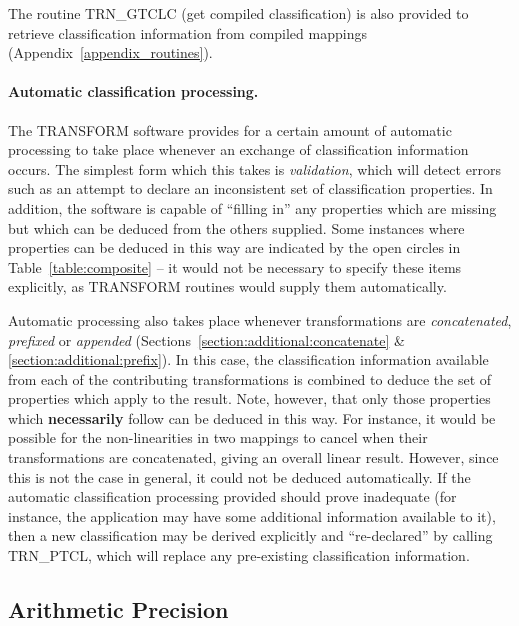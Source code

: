 \documentclass[twoside,nolof,11pt]{starlink}
\providecommand{\name}[1]{\small{#1}}
\begin{document}
The routine \name{TRN\_GTCLC} (get compiled classification) is also provided
to retrieve classification information from compiled mappings
(Appendix~\ref{appendix_routines}).

\paragraph{Automatic classification processing.}
The \name{TRANSFORM} software provides for a certain amount of automatic
processing to take place whenever an exchange of classification information
occurs.
The simplest form which this takes is \emph{validation}, which will detect
errors such as an attempt to declare an inconsistent set of classification
properties.
In addition, the software is capable of ``filling in'' any properties which
are missing but which can be deduced from the others supplied.
Some instances where properties can be deduced in this way are indicated by
the open circles in Table~\ref{table:composite} -- it would not be
necessary to specify these items explicitly, as \name{TRANSFORM} routines
would supply them automatically.

Automatic processing also takes place whenever transformations are
\emph{concatenated}, \emph{prefixed} or \emph{appended}
(Sections~\ref{section:additional:concatenate} \&
\ref{section:additional:prefix}).
In this case, the classification information available from each of the
contributing transformations is combined to deduce the set of
properties which apply to the result.
Note, however, that only those properties which \textbf{necessarily} follow can
be deduced in this way.
For instance, it would be possible for the non-linearities in two mappings
to cancel when their transformations are concatenated, giving an overall
linear result.
However, since this is not the case in general, it could not be deduced
automatically.
If the automatic classification processing provided should prove inadequate
(for instance, the application may have some additional information
available to it), then a new classification may be derived explicitly and
``re-declared'' by calling \name{TRN\_PTCL}, which will replace any
pre-existing classification information.


\subsection{Arithmetic Precision}

\label{section:advanced:precision}
\end{document}
